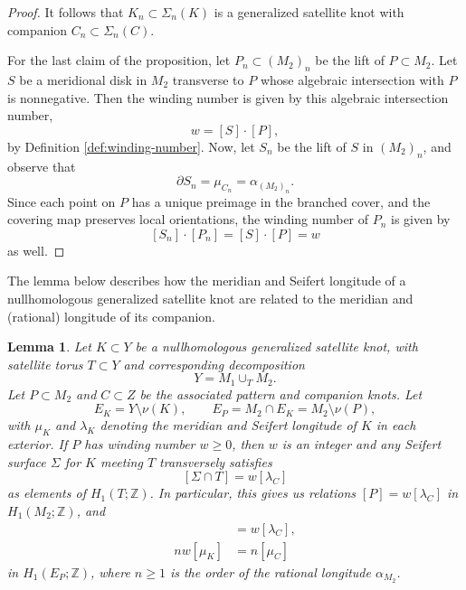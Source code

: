 \documentclass[11pt]{amsart}
\newtheorem {lemma}[theorem]{Lemma}
\numberwithin{equation}{section}
\numberwithin{theorem}{section}
\theoremstyle{definition}
\newcommand{\Z}{\mathbb{Z}}
\begin{document}
\begin{proof}
It follows that $K_n\subset\Sigma_n(K)$ is a generalized satellite knot with companion $C_n\subset \Sigma_n(C)$.

For the last claim of the proposition, let $P_n\subset (M_2)_n$ be the lift of $P\subset M_2$. Let $S$ be a meridional disk in $M_2$  transverse to $P$  whose algebraic intersection with $P$ is nonnegative. Then the winding number is given by this algebraic intersection number, \[w=[S]\cdot[P],\] by Definition \ref{def:winding-number}. Now, let $S_n$ be the lift of $S$ in $(M_2)_n$, and observe that \[\partial S_n = \mu_{C_n} = \alpha_{(M_2)_n}.\] Since each point on $P$ has a unique preimage in the branched cover, and the covering map preserves local orientations, the winding number of $P_n$ is  given by \[[S_n]\cdot [P_n] = [S] \cdot [P] = w\] as well.
\end{proof}

The lemma below describes how the meridian and Seifert longitude of a nullhomologous generalized satellite knot are related to the meridian and (rational) longitude of its companion. 

\begin{lemma} \label{lem:winding-number-satellite}
Let $K \subset Y$ be a nullhomologous generalized satellite knot, with satellite torus $T \subset Y$ and corresponding decomposition \[Y = M_1 \cup_T M_2.\]  Let $P \subset M_2$ and $C \subset Z$ be the associated pattern and companion knots.  Let \[E_K = Y \setminus \nu(K), \qquad E_P = M_2\cap E_K = M_2 \setminus \nu(P),\] with $\mu_K$ and $\lambda_K$ denoting the meridian and Seifert longitude of $K$ in each exterior.
If $P$ has winding number $w \geq 0$, then $w$ is an integer and any Seifert surface $\Sigma$ for $K$ meeting $T$ transversely satisfies
\[ [\Sigma \cap T] = w[\lambda_C] \]
as elements of $H_1(T;\Z)$.  In particular, this gives us relations $[P] = w[\lambda_C]$ in $H_1(M_2;\Z)$, and
\begin{align*}
[\lambda_K] &= w[\lambda_C], \\
nw[\mu_K] &= n[\mu_C]
\end{align*}
in $H_1(E_P;\Z)$, where $n \geq 1$ is the order of the rational longitude $\alpha_{M_2}$.
\end{lemma}
\end{document}
